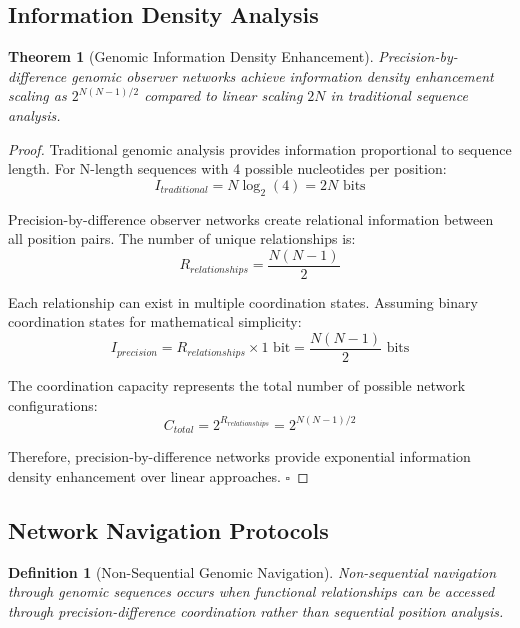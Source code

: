 \documentclass[12pt,a4paper]{article}
\newtheorem{theorem}{Theorem}
\newtheorem{definition}{Definition}
\begin{document}
\subsection{Information Density Analysis}

\begin{theorem}[Genomic Information Density Enhancement]
\label{thm:info_density}
Precision-by-difference genomic observer networks achieve information density enhancement scaling as $2^{N(N-1)/2}$ compared to linear scaling $2N$ in traditional sequence analysis.
\end{theorem}

\begin{proof}
Traditional genomic analysis provides information proportional to sequence length. For N-length sequences with 4 possible nucleotides per position:
\begin{equation}
I_{traditional} = N \log_2(4) = 2N \text{ bits}
\end{equation}

Precision-by-difference observer networks create relational information between all position pairs. The number of unique relationships is:
\begin{equation}
R_{relationships} = \frac{N(N-1)}{2}
\end{equation}

Each relationship can exist in multiple coordination states. Assuming binary coordination states for mathematical simplicity:
\begin{equation}
I_{precision} = R_{relationships} \times 1 \text{ bit} = \frac{N(N-1)}{2} \text{ bits}
\end{equation}

The coordination capacity represents the total number of possible network configurations:
\begin{equation}
C_{total} = 2^{R_{relationships}} = 2^{N(N-1)/2}
\end{equation}

Therefore, precision-by-difference networks provide exponential information density enhancement over linear approaches. $\square$
\end{proof}

\subsection{Network Navigation Protocols}

\begin{definition}[Non-Sequential Genomic Navigation]
Non-sequential navigation through genomic sequences occurs when functional relationships can be accessed through precision-difference coordination rather than sequential position analysis.
\end{definition}
\end{document}
